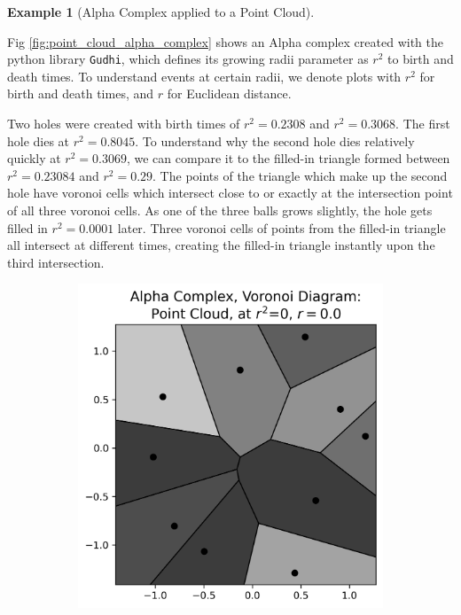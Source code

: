 \documentclass[ma]{uncgdissertationexp}
\theoremstyle{plain}
\theoremstyle{definition}
\newtheorem{example}[theorem]{Example}
\theoremstyle{remark}
\begin{document}
\newpage
\begin{example}[Alpha Complex applied to a Point Cloud]\label{ex:point_cloud_alpha}
\par Fig \ref{fig:point_cloud_alpha_complex} shows an Alpha complex created with the python library \verb"Gudhi", which defines its growing radii parameter as $r^{2}$ to birth and death times. To understand events at certain radii, we denote plots with $r^{2}$ for birth and death times, and $r$ for Euclidean distance.
\par Two holes were created with birth times of $r^{2}=0.2308$ and $r^{2}=0.3068$. The first hole dies at $r^{2}=0.8045$. To understand why the second hole dies relatively quickly at $r^{2}=0.3069$, we can compare it to the filled-in triangle formed between $r^{2} = 0.23084$ and $r^{2} = 0.29$. The points of the triangle which make up the second hole have voronoi cells which intersect close to or exactly at the intersection point of all three voronoi cells. As one of the three balls grows slightly, the hole gets filled in $r^{2}=0.0001$ later. Three voronoi cells of points from the filled-in triangle all intersect at different times, creating the filled-in triangle instantly upon the third intersection.
\begin{figure}[H]
    \centering
    \begin{subfigure}[b]{0.26\textwidth}
        \includegraphics[width=\textwidth]{point_cloud_plot_alpha_0.png}

\end{subfigure}
\end{figure}
\end{example}
\end{document}
